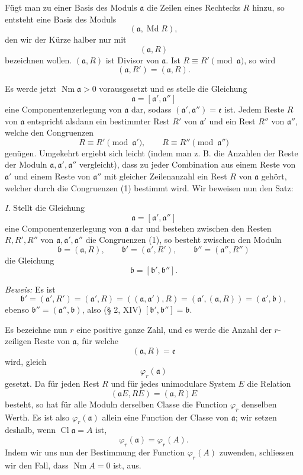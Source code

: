 \documentclass[11pt,a4paper]{article}
\newcommand{\Cl}{\operatorname{Cl}}
\newcommand{\Md}{\operatorname{Md}}
\newcommand{\Nm}{\operatorname{Nm}}
\begin{document}
Fügt man zu einer Basis des Moduls $\mathfrak a$ die Zeilen eines Rechtecks $R$ hinzu, so entsteht eine Basis des Moduls
\[
 (\mathfrak a,\Md R),
\]
den wir der Kürze halber nur mit
\[
 (\mathfrak a,R)
\]
bezeichnen wollen. $(\mathfrak a,R)$ ist Divisor von $\mathfrak a$. Ist $R\equiv R'\pmod{\mathfrak a}$, so wird
\[
 (\mathfrak a,R')=(\mathfrak a,R).
\]

Es werde jetzt $\Nm\mathfrak a>0$ vorausgesetzt und es stelle die Gleichung
\[
 \mathfrak a=[\mathfrak a',\mathfrak a'']
\]
eine Componentenzerlegung von $\mathfrak a$ dar, sodass $(\mathfrak a',\mathfrak a'')=\mathfrak e$ ist. Jedem Reste $R$ von $\mathfrak a$ entspricht alsdann ein bestimmter Rest $R'$ von $\mathfrak a'$ und ein Rest $R''$ von $\mathfrak a''$, welche den Congruenzen
\begin{equation}
 R\equiv R'\pmod{\mathfrak a'},
 \qquad
 R\equiv R''\pmod{\mathfrak a''}
\tag{1}
\end{equation}
genügen. Umgekehrt ergiebt sich leicht (indem man z. B. die Anzahlen der Reste der Moduln $\mathfrak a,\mathfrak a',\mathfrak a''$ vergleicht), dass zu jeder Combination aus einem Reste von $\mathfrak a'$ und einem Reste von $\mathfrak a''$ mit gleicher Zeilenanzahl ein Rest $R$ von $\mathfrak a$ gehört, welcher durch die Congruenzen (1) bestimmt wird. Wir beweisen nun den Satz:

\emph{I.} Stellt die Gleichung
\[
 \mathfrak a=[\mathfrak a',\mathfrak a'']
\]
eine Componentenzerlegung von $\mathfrak a$ dar und bestehen zwischen den Resten $R,R',R''$ von $\mathfrak a,\mathfrak a',\mathfrak a''$ die Congruenzen (1), so besteht zwischen den Moduln
\[
 \mathfrak b=(\mathfrak a,R),
 \qquad
 \mathfrak b'=(\mathfrak a',R'),
 \qquad
 \mathfrak b''=(\mathfrak a'',R'')
\]
die Gleichung
\[
 \mathfrak b=[\mathfrak b',\mathfrak b''].
\]

\emph{Beweis:} Es ist
\[
 \mathfrak b'=(\mathfrak a',R')=(\mathfrak a',R)=((\mathfrak a,\mathfrak a'),R)
 =(\mathfrak a',(\mathfrak a,R))=(\mathfrak a',\mathfrak b),
\]
ebenso $\mathfrak b''=(\mathfrak a'',\mathfrak b)$, also (§ 2, XIV) $[\mathfrak b',\mathfrak b'']=\mathfrak b$.

Es bezeichne nun $r$ eine positive ganze Zahl, und es werde die Anzahl der $r$-zeiligen Reste von $\mathfrak a$, für welche
\[
 (\mathfrak a,R)=\mathfrak e
\]
wird, gleich
\[
 \varphi_r(\mathfrak a)
\]
gesetzt. Da für jeden Rest $R$ und für jedes unimodulare System $E$ die Relation
\[
 (\mathfrak aE,RE)=(\mathfrak a,R)E
\]
besteht, so hat für alle Moduln derselben Classe die Function $\varphi_r$ denselben Werth. Es ist also $\varphi_r(\mathfrak a)$ allein eine Function der Classe von $\mathfrak a$; wir setzen deshalb, wenn $\Cl\mathfrak a=A$ ist,
\[
 \varphi_r(\mathfrak a)=\varphi_r(A).
\]
Indem wir uns nun der Bestimmung der Function $\varphi_r(A)$ zuwenden, schliessen wir den Fall, dass $\Nm A=0$ ist, aus.
\end{document}
